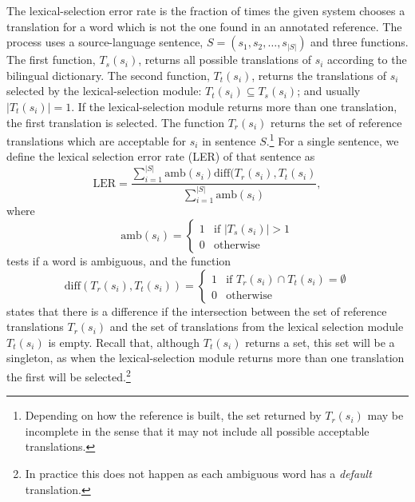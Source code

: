 \documentclass[11pt]{article}
\newcommand{\comment}[1]{\todo{#1}}
\begin{document}
The lexical-selection error rate is the fraction of times the given
system chooses a translation for a word which is not  the one found in an
annotated reference. The process uses a source-language sentence, $S =
(s_1, s_2, \ldots, s_{|S|})$ and three functions. The first function,
$T_s(s_i)$, returns all possible translations of $s_i$ according to
the bilingual dictionary. The second function, $T_t(s_i)$, returns the
translations of $s_i$ selected by the lexical-selection module:
$T_t(s_i) \subseteq T_s(s_i)$; and usually $|T_t(s_i)| = 1$. If the
lexical-selection module returns more than one translation, the first
translation is selected. 
The
function $T_r(s_i)$ returns the set of reference translations which
are acceptable for $s_i$ in sentence $S$.\footnote{Depending on how
  the reference is built, the set returned by $T_r(s_i)$ may be
  incomplete in the sense that it may not include all possible
  acceptable translations.} For a
single sentence, we define the lexical selection error rate (LER) of
that sentence as
\begin{equation}
\mathrm{LER} = \frac{\sum_{i=1}^{|S|} \mathrm{amb}(s_i) \mathrm{diff}(T_r(s_i), T_t(s_i)}{\sum_{i=1}^{|S|} \mathrm{amb}(s_i)},
\label{eq:ler}
\end{equation}
where
\begin{equation}
\mathrm{amb}(s_i) = \left \{ \begin{matrix}
                 1 & \mbox{if } |T_s(s_i)| > 1   \\
                 0 & \mbox{otherwise} \end{matrix} \right.
\label{eq:amb}
\end{equation}
 tests if a word is ambiguous, and the  function 
\begin{equation}
\mathrm{diff}(T_r(s_i), T_t(s_i)) = \left \{ \begin{matrix}
                 1 & \mbox{if } T_r(s_i) \cap T_t(s_i) = \emptyset   \\
                 0 & \mbox{otherwise} \end{matrix} \right.
\label{eq:diff}
\end{equation}
states that there is a difference if the intersection between the set
of reference translations $T_r(s_i)$ and the set of translations from
the lexical selection module $T_t(s_i)$ is empty.  Recall that,
although $T_t(s_i)$ returns a set, this set will be a singleton, as
when the lexical-selection module returns more than one translation
the first will be selected.\footnote{In practice this does not happen
as each ambiguous word has a \emph{default} translation.} 
\end{document}
